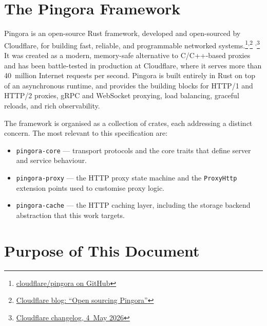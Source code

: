 %

\section{The Pingora Framework}

Pingora is an open-source Rust framework, developed and open-sourced by
Cloudflare, for building fast, reliable, and programmable networked
systems.\footnote{\href{https://github.com/cloudflare/pingora}{cloudflare/pingora on GitHub}}\textsuperscript{,}\footnote{\href{https://blog.cloudflare.com/pingora-open-source/}{Cloudflare blog: ``Open sourcing Pingora''}}%
\textsuperscript{,}\footnote{\href{https://developers.cloudflare.com/changelog/post/2026-05-04-pingora-powers-cache/}{Cloudflare changelog, 4~May 2026}}
It was created as a modern, memory-safe alternative to C/C++-based proxies and has been
battle-tested in production at Cloudflare, where it serves more than
40~million Internet requests per second. Pingora is built entirely in Rust on
top of an asynchronous runtime, and provides the building blocks for HTTP/1
and HTTP/2 proxies, gRPC and WebSocket proxying, load balancing, graceful
reloads, and rich observability.

The framework is organised as a collection of crates, each addressing a
distinct concern. The most relevant to this specification are:

\begin{itemize}
    \item \texttt{pingora-core} --- transport protocols and the core traits
          that define server and service behaviour.
    \item \texttt{pingora-proxy} --- the HTTP proxy state machine and the
          \texttt{ProxyHttp} extension points used to customise proxy logic.
    \item \texttt{pingora-cache} --- the HTTP caching layer, including the
          storage backend abstraction that this work targets.
\end{itemize}

\section{Purpose of This Document}

